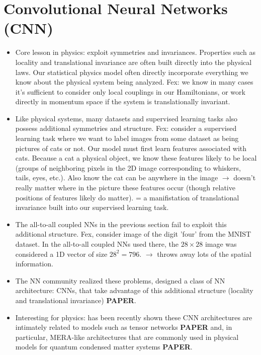 \documentclass[norsk,a4paper,11pt]{article}
\begin{document}
\section{Convolutional Neural Networks (CNN)}
\begin{itemize}
	\item Core lesson in physics: exploit symmetries and invariances. Properties such as locality and translational invariance are often built directly into the physical laws. Our statistical physics model often directly incorporate everything we know about the physical system being analyzed. Fex: we know in many cases it's sufficient to consider only local couplings in our Hamiltonians, or work directly in momentum space if the system is translationally invariant. 
	\item Like physical systems, many datasets and supervised learning tasks also possess additional symmetries and structure. Fex: consider a supervised learning task where we want to label images from some dataset as being pictures of cats or not. Our model must first learn features associated with cats. Because a cat a physical object, we know these features likely to be local (groups of neighboring pixels in the 2D image corresponding to whiskers, tails, eyes, etc.). Also know the cat can be anywhere in the image $\rightarrow$ doesn't really matter where in the picture these features occur (though relative positions of features likely do matter). = a manifistation of translational invariance built into our supervised learning task. 
	\item The all-to-all coupled NNs in the previous section fail to exploit this additional structure. Fex, consider image of the digit 'four' from the MNIST dataset. In the all-to-all coupled NNs used there, the $28\times 28$ image was considered a 1D vector of size $28^2 = 796$. $\rightarrow$ throws away lots of the spatial information. 
	\item The NN community realized these problems, designed a class of NN architecture: CNNs, that take advantage of this additional structure (locality and translational invariance) \textbf{PAPER}. 
	\item Interesting for physics: has been recently shown these CNN architectures are intimately related to models such as tensor networks \textbf{PAPER} and, in particular, MERA-like architectures that are commonly used in physical models for quantum condensed matter systems \textbf{PAPER}.

\end{itemize}
\end{document}
